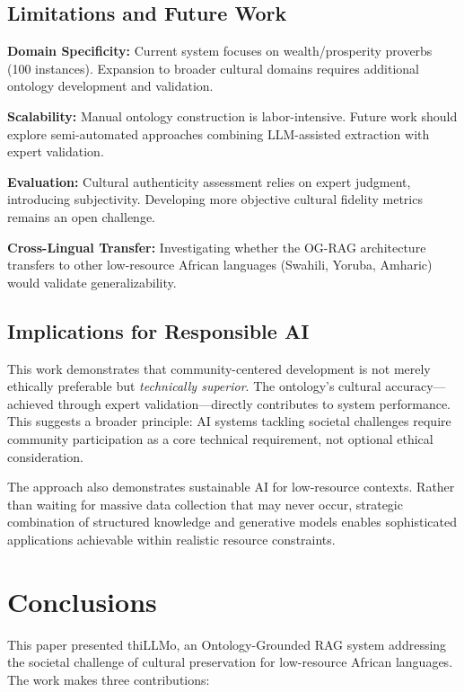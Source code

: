 \documentclass[a4paper,11pt]{article}
\begin{document}
\subsection{Limitations and Future Work}

\textbf{Domain Specificity:} Current system focuses on wealth/prosperity proverbs (100 instances). Expansion to broader cultural domains requires additional ontology development and validation.

\textbf{Scalability:} Manual ontology construction is labor-intensive. Future work should explore semi-automated approaches combining LLM-assisted extraction with expert validation.

\textbf{Evaluation:} Cultural authenticity assessment relies on expert judgment, introducing subjectivity. Developing more objective cultural fidelity metrics remains an open challenge.

\textbf{Cross-Lingual Transfer:} Investigating whether the OG-RAG architecture transfers to other low-resource African languages (Swahili, Yoruba, Amharic) would validate generalizability.

\subsection{Implications for Responsible AI}

This work demonstrates that community-centered development is not merely ethically preferable but \emph{technically superior}. The ontology's cultural accuracy—achieved through expert validation—directly contributes to system performance. This suggests a broader principle: AI systems tackling societal challenges require community participation as a core technical requirement, not optional ethical consideration.

The approach also demonstrates sustainable AI for low-resource contexts. Rather than waiting for massive data collection that may never occur, strategic combination of structured knowledge and generative models enables sophisticated applications achievable within realistic resource constraints.

\section{Conclusions}

This paper presented thiLLMo, an Ontology-Grounded RAG system addressing the societal challenge of cultural preservation for low-resource African languages. The work makes three contributions:
\end{document}

